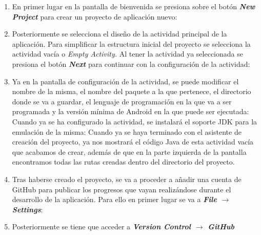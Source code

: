     \begin{enumerate}
        \item En primer lugar en la pantalla de bienvenida se presiona sobre el botón \textbf{\textit{New Project}} para crear un proyecto de aplicación nuevo:
        \item Posteriormente se selecciona el diseño de la actividad principal
        de la aplicación. Para simplificar la estructura inicial del proyecto se
        selecciona la actividad vacía o \textit{Empty Activity.} Al tener la
        actividad ya seleccionada se presiona el botón \textit{\textbf{Next}}
        para continuar con la configuración de la actividad:
        \item Ya en la pantalla de configuración de la actividad, se puede
        modificar el nombre de la misma, el nombre del paquete a la que
        pertenece, el directorio donde se va a guardar, el lenguaje de
        programación en la que va a ser programada y la versión mínima de
        Android en la que puede ser ejecutada:
        Cuando ya se ha configurado la actividad, se instalará el soporte JDK para la emulación de la misma:
        Cuando ya se haya terminado con el asistente de creación del proyecto, ya nos mostrará el código Java de esta actividad vacía que acabamos de crear, además de que en la parte izquierda de la pantalla encontramos todas las rutas creadas dentro del directorio del proyecto.
        \item Tras haberse creado el proyecto, se va a proceder a añadir una
        cuenta de GitHub para publicar los progresos que vayan realizándose
        durante el desarrollo de la aplicación. Para ello en primer lugar se va
        a \textit{\textbf{File $\rightarrow$ Settings}}:
        \item Posteriormente se tiene que acceder a \textit{\textbf{Version Control $\rightarrow$ GitHub}}

\end{enumerate}

